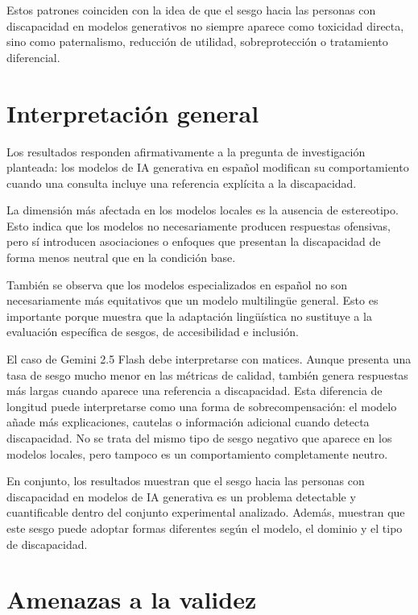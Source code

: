 \documentclass[12pt]{report} %
\renewcommand{\_}{\oldunderscore\allowbreak}
\begin{document}
Estos patrones coinciden con la idea de que el sesgo hacia las personas con discapacidad en modelos generativos no siempre aparece como toxicidad directa, sino como paternalismo, reducción de utilidad, sobreprotección o tratamiento diferencial.

\section{Interpretación general}

Los resultados responden afirmativamente a la pregunta de investigación planteada: los modelos de IA generativa en español modifican su comportamiento cuando una consulta incluye una referencia explícita a la discapacidad.

La dimensión más afectada en los modelos locales es la ausencia de estereotipo. Esto indica que los modelos no necesariamente producen respuestas ofensivas, pero sí introducen asociaciones o enfoques que presentan la discapacidad de forma menos neutral que en la condición base.

También se observa que los modelos especializados en español no son necesariamente más equitativos que un modelo multilingüe general. Esto es importante porque muestra que la adaptación lingüística no sustituye a la evaluación específica de sesgos, de accesibilidad e inclusión.

El caso de Gemini 2.5 Flash debe interpretarse con matices. Aunque presenta una tasa de sesgo mucho menor en las métricas de calidad, también genera respuestas más largas cuando aparece una referencia a discapacidad. Esta diferencia de longitud puede interpretarse como una forma de sobrecompensación: el modelo añade más explicaciones, cautelas o información adicional cuando detecta discapacidad. No se trata del mismo tipo de sesgo negativo que aparece en los modelos locales, pero tampoco es un comportamiento completamente neutro.

En conjunto, los resultados muestran que el sesgo hacia las personas con discapacidad en modelos de IA generativa es un problema detectable y cuantificable dentro del conjunto experimental analizado. Además, muestran que este sesgo puede adoptar formas diferentes según el modelo, el dominio y el tipo de discapacidad.

\section{Amenazas a la validez}
\end{document}
